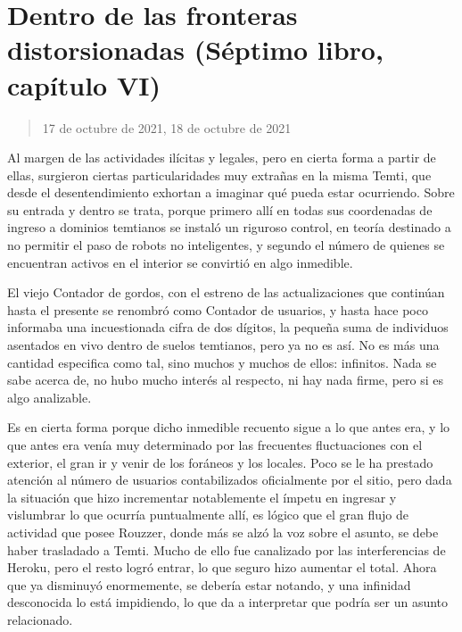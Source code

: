 \documentclass[
  spanish,
]{book}
\begin{document}
\hypertarget{dentro-de-las-fronteras-distorsionadas-suxe9ptimo-libro-capuxedtulo-vi}{%
\section{Dentro de las fronteras distorsionadas (Séptimo libro, capítulo VI)}\label{dentro-de-las-fronteras-distorsionadas-suxe9ptimo-libro-capuxedtulo-vi}}

\begin{quote}
17 de octubre de 2021, 18 de octubre de 2021
\end{quote}

Al margen de las actividades ilícitas y legales, pero en cierta forma a partir de ellas, surgieron ciertas particularidades muy extrañas en la misma Temti, que desde el desentendimiento exhortan a imaginar qué pueda estar ocurriendo. Sobre su entrada y dentro se trata, porque primero allí en todas sus coordenadas de ingreso a dominios temtianos se instaló un riguroso control, en teoría destinado a no permitir el paso de robots no inteligentes, y segundo el número de quienes se encuentran activos en el interior se convirtió en algo inmedible.

El viejo Contador de gordos, con el estreno de las actualizaciones que continúan hasta el presente se renombró como Contador de usuarios, y hasta hace poco informaba una incuestionada cifra de dos dígitos, la pequeña suma de individuos asentados en vivo dentro de suelos temtianos, pero ya no es así. No es más una cantidad especifica como tal, sino muchos y muchos de ellos: infinitos. Nada se sabe acerca de, no hubo mucho interés al respecto, ni hay nada firme, pero si es algo analizable.

Es en cierta forma porque dicho inmedible recuento sigue a lo que antes era, y lo que antes era venía muy determinado por las frecuentes fluctuaciones con el exterior, el gran ir y venir de los foráneos y los locales. Poco se le ha prestado atención al número de usuarios contabilizados oficialmente por el sitio, pero dada la situación que hizo incrementar notablemente el ímpetu en ingresar y vislumbrar lo que ocurría puntualmente allí, es lógico que el gran flujo de actividad que posee Rouzzer, donde más se alzó la voz sobre el asunto, se debe haber trasladado a Temti. Mucho de ello fue canalizado por las interferencias de Heroku, pero el resto logró entrar, lo que seguro hizo aumentar el total. Ahora que ya disminuyó enormemente, se debería estar notando, y una infinidad desconocida lo está impidiendo, lo que da a interpretar que podría ser un asunto relacionado.
\end{document}
